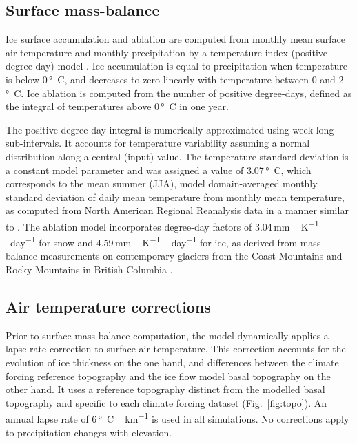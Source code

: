
\subsection{Surface mass-balance}

Ice surface accumulation and ablation are computed from monthly mean surface air temperature and monthly precipitation by a temperature-index (positive degree-day) model \citep{hock-2003}. Ice accumulation is equal to precipitation when temperature is below 0\,\unit{\degree C}, and decreases to zero linearly with temperature between 0 and 2\,\unit{\degree C}. Ice ablation is computed from the number of positive degree-days, defined as the integral of temperatures above 0\,\unit{\degree C} in one year. 

The positive degree-day integral \citep{calov-greve-2005} is numerically approximated using week-long sub-intervals. It accounts for temperature variability assuming a normal distribution along a central (input) value. The temperature standard deviation is a constant model parameter and was assigned a value of 3.07\,\unit{\degree C}, which corresponds to the mean summer (JJA), model domain-averaged monthly standard deviation of daily mean temperature from monthly mean temperature, as computed from North American Regional Reanalysis data \citep{data:narr} in a manner similar to \citet{seguinot-2013}. The ablation model incorporates degree-day factors of 3.04\,\unit{mm\,K^{-1}\,day^{-1}} for snow and 4.59\,\unit{mm\,K^{-1}\,day^{-1}} for ice, as derived from mass-balance measurements on contemporary glaciers from the Coast Mountains and Rocky Mountains in British Columbia \citep{shea-etal-2009}.


\subsection{Air temperature corrections}

Prior to surface mass balance computation, the model dynamically applies a lapse-rate correction to surface air temperature. This correction accounts for the evolution of ice thickness on the one hand, and differences between the climate forcing reference topography and the ice flow model basal topography on the other hand. It uses a reference topography distinct from the modelled basal topography and specific to each climate forcing dataset (Fig.~\ref{fig:topo}). An annual lapse rate of 6\,\unit{\degree C\,km^{-1}} is used in all simulations. No corrections apply to precipitation changes with elevation.

